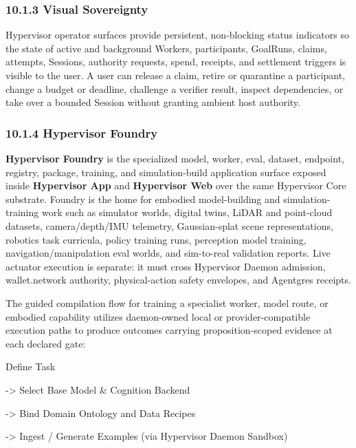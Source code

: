 \documentclass[
  11pt,
]{article}
\begin{document}
\hypertarget{visual-sovereignty}{%
\subsubsection{10.1.3 Visual Sovereignty}\label{visual-sovereignty}}

Hypervisor operator surfaces provide persistent, non-blocking status
indicators so the state of active and background Workers, participants,
GoalRuns, claims, attempts, Sessions, authority requests, spend, receipts,
and settlement triggers is visible to the user. A user can release a
claim, retire or quarantine a participant, change a budget or deadline,
challenge a verifier result, inspect dependencies, or take over a bounded
Session without granting ambient host authority.

\hypertarget{hypervisor-foundry}{%
\subsubsection{10.1.4 Hypervisor Foundry}\label{hypervisor-foundry}}

\textbf{Hypervisor Foundry} is the specialized model, worker, eval,
dataset, endpoint, registry, package, training, and simulation-build
application surface exposed inside \textbf{Hypervisor App} and
\textbf{Hypervisor Web} over the same Hypervisor Core substrate.
Foundry is the home for embodied model-building and simulation-training
work such as simulator worlds, digital twins, LiDAR and point-cloud
datasets, camera/depth/IMU telemetry, Gaussian-splat scene
representations, robotics task curricula, policy training runs,
perception model training, navigation/manipulation eval worlds, and
sim-to-real validation reports. Live actuator execution is separate: it
must cross Hypervisor Daemon admission, wallet.network authority,
physical-action safety envelopes, and Agentgres receipts.

The guided compilation flow for training a specialist worker, model
route, or embodied capability utilizes daemon-owned local or
provider-compatible execution paths to produce outcomes carrying
proposition-scoped evidence at each declared gate:

Define Task

-\textgreater{} Select Base Model \& Cognition Backend

-\textgreater{} Bind Domain Ontology and Data Recipes

-\textgreater{} Ingest / Generate Examples (via Hypervisor Daemon
Sandbox)
\end{document}
